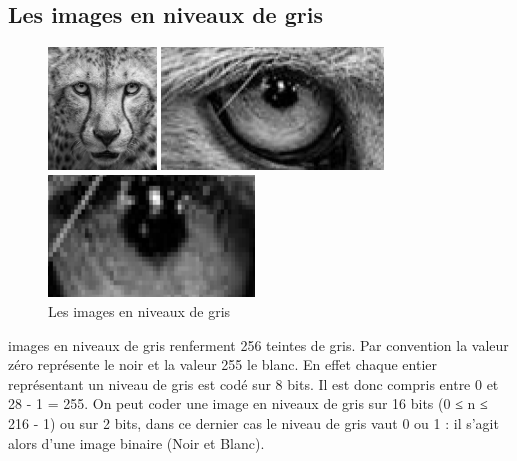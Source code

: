 \documentclass[12pt,a4paper]{report}
\numberwithin{equation}{subsection}
\numberwithin{equation}{section}
\begin{document}
\subsection{Les images en niveaux de gris}
\begin{figure}[!h]
    \centering
    \begin{minipage}[b]{0.3\textwidth}
        \includegraphics[height=3.25cm,width=3.5cm \textwidth]{gris.png}
    \end{minipage}
    \begin{minipage}[b]{0.3\textwidth}
        \includegraphics[height=3.25cm ,width=3.5cm \textwidth]{gray3.png}
    \end{minipage}
    \begin{minipage}[b]{0.3\textwidth}
        \includegraphics[height=3.25cm, width=3.5cm \textwidth]{gray2.png}
    \end{minipage}
    \caption{Les images en niveaux de gris}
\end{figure}
\raggedrightLes images en niveaux de gris renferment 256 teintes de gris. Par convention la valeur zéro représente le noir et la valeur 255 le blanc. En effet chaque entier représentant un niveau de gris est codé sur 8 bits. 
\newline Il est donc compris entre 0 et 28 - 1 = 255. On peut coder une image en niveaux de gris sur 16 bits (0 ≤ n ≤ 216 - 1) ou sur 2 bits, dans ce dernier cas le niveau de gris vaut 0 ou 1 : il s'agit alors d'une image binaire (Noir et Blanc).
 
\end{document}
